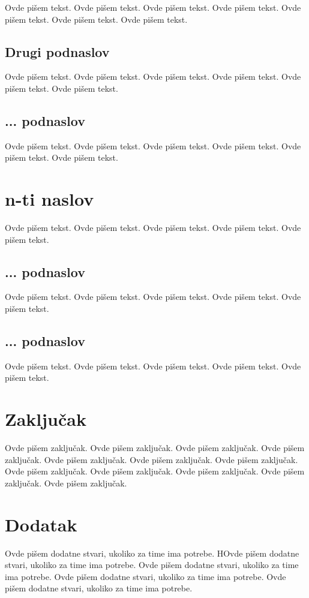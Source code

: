 \documentclass[a4paper]{article}
\begin{document}
Ovde pišem tekst. 
Ovde pišem tekst. 
Ovde pišem tekst. 
Ovde pišem tekst. 
Ovde pišem tekst. 
Ovde pišem tekst. 
Ovde pišem tekst. 

\subsection{Drugi podnaslov}
\label{subsec:podnaslov2}

Ovde pišem tekst. 
Ovde pišem tekst. 
Ovde pišem tekst. 
Ovde pišem tekst. 
Ovde pišem tekst. 
Ovde pišem tekst. 


\subsection{... podnaslov}
\label{subsec:podnaslovN}

Ovde pišem tekst. 
Ovde pišem tekst. 
Ovde pišem tekst. 
Ovde pišem tekst. 
Ovde pišem tekst. 
Ovde pišem tekst. 

\section{n-ti naslov}
\label{sec:naslovN}

Ovde pišem tekst. 
Ovde pišem tekst. 
Ovde pišem tekst. 
Ovde pišem tekst. 
Ovde pišem tekst. 

\subsection{... podnaslov}
\label{subsec:podnaslovK}

Ovde pišem tekst. 
Ovde pišem tekst. 
Ovde pišem tekst. 
Ovde pišem tekst. 
Ovde pišem tekst. 

\subsection{... podnaslov}
\label{subsec:podnaslovM}

Ovde pišem tekst. 
Ovde pišem tekst. 
Ovde pišem tekst. 
Ovde pišem tekst. 
Ovde pišem tekst. 


\section{Zaključak}
\label{sec:zakljucak}

Ovde pišem zaključak. 
Ovde pišem zaključak. 
Ovde pišem zaključak. 
Ovde pišem zaključak. 
Ovde pišem zaključak. 
Ovde pišem zaključak. 
Ovde pišem zaključak. 
Ovde pišem zaključak. 
Ovde pišem zaključak. 
Ovde pišem zaključak. 
Ovde pišem zaključak. 
Ovde pišem zaključak. 


\appendix
 


\appendix
\section{Dodatak}
Ovde pišem dodatne stvari, ukoliko za time ima potrebe.
HOvde pišem dodatne stvari, ukoliko za time ima potrebe.
Ovde pišem dodatne stvari, ukoliko za time ima potrebe.
Ovde pišem dodatne stvari, ukoliko za time ima potrebe.
Ovde pišem dodatne stvari, ukoliko za time ima potrebe.
\end{document}

